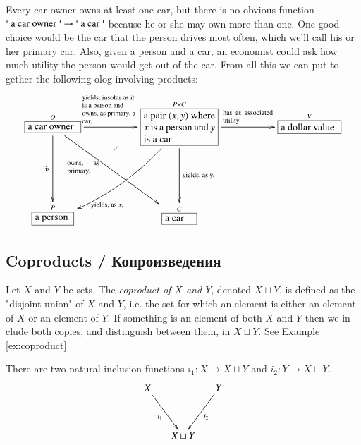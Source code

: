 \documentclass{book}
\def\tn{\textnormal}
\def\to{\rightarrow}
\def\taking{\colon}
\def\rr{\raggedright}
\newcommand{\LA}[2]{\ar[#1]^-{\tn {#2}}}
\newcommand{\LAL}[2]{\ar[#1]_-{\tn {#2}}}
\newcommand{\obox}[3]{\stackrel{#1}{\fbox{\parbox{#2}{#3}}}}
\newcommand{\fakebox}[1]{\tn{$\ulcorner$#1$\urcorner$}}
\theoremstyle{theoremENG}
\theoremstyle{lemmaENG}
\theoremstyle{propositionENG}
\theoremstyle{corollaryENG}
\theoremstyle{factENG}
\theoremstyle{remarkENG}
\theoremstyle{exampleENG}
\newtheorem{exampleENG}[subsubsection]{\begin{english}Example\end{english}}
\theoremstyle{warningENG}
\theoremstyle{questionENG}
\theoremstyle{guessENG}
\theoremstyle{answerENG}
\theoremstyle{constructionENG}
\theoremstyle{rulesENG}
\theoremstyle{excENG}
\theoremstyle{appENG}
\theoremstyle{definitionENG}
\newtheorem{definitionENG}[subsubsection]{\begin{english}Definition\end{english}}
\theoremstyle{notationENG}
\theoremstyle{conjectureENG}
\theoremstyle{postulateENG}
\theoremstyle{theoremRUS}
\theoremstyle{lemmaRUS}
\theoremstyle{propositionRUS}
\theoremstyle{corollaryRUS}
\theoremstyle{factRUS}
\theoremstyle{remarkRUS}
\theoremstyle{exampleRUS}
\theoremstyle{warningRUS}
\theoremstyle{questionRUS}
\theoremstyle{guessRUS}
\theoremstyle{answerRUS}
\theoremstyle{constructionRUS}
\theoremstyle{rulesRUS}
\theoremstyle{excRUS}
\theoremstyle{appRUS}
\theoremstyle{definitionRUS}
\theoremstyle{notationRUS}
\theoremstyle{conjectureRUS}
\theoremstyle{postulateRUS}
\begin{document}
\begin{english}
\begin{exampleENG}
Every car owner owns at least one car, but there is no obvious function $\fakebox{a car owner}\to\fakebox{a car}$ because he or she may own more than one. One good choice would be the car that the person drives most often, which we'll call his or her primary car. Also, given a person and a car, an economist could ask how much utility the person would get out of the car. From all this we can put together the following olog involving products:
$$
\xymatrixnocompile{\obox{O}{.7in}{a car owner}\LAL{dd}{is}\ar[ddrr]_(.35){\parbox{.45in}{\scriptsize owns, as primary,}}\LA{rr}{\parbox{.8in}{\rr\scriptsize yields, insofar as it is a person and owns, as primary, a car,}}&\ar@{}[d]^(.4){\checkmark}&
\obox{P\times C}{1in}{a pair $(x,y)$ where $x$ is a person and $y$ is a car}\ar@/^1pc/[ddll]^(.7){\tn{yields, as }x,}\LA{dd}{\tn{yields, as }y,}\LA{rr}{\parbox{.7in}{\scriptsize has as associated utility}}&&\obox{V}{.8in}{a dollar value}\\&&\\\obox{P}{.5in}{a person}&&\obox{C}{.4in}{a car}
}
$$

\begin{russian} \end{russian}

\end{exampleENG}


\subsection{Coproducts / Копроизведения}\label{sec:coproducts}

\begin{definitionENG}\label{def:coproduct}

Let $X$ and $Y$ be sets. The {\em coproduct of $X$ and $Y$}, denoted $X\sqcup Y$, is defined as the "disjoint union" of $X$ and $Y$, i.e. the set for which an element is either an element of $X$ or an element of $Y$. If something is an element of both $X$ and $Y$ then we include both copies, and distinguish between them, in $X\sqcup Y$. See Example \ref{ex:coproduct}

\begin{russian} \end{russian}

There are two natural inclusion functions $i_1\taking X\to X\sqcup Y$ and $i_2\taking Y\to X\sqcup Y$.
$$\xymatrix@=15pt{X\ar[ddr]_{i_1}&&Y\ar[ddl]^{i_2}\\\\&X\sqcup Y}$$


\end{definitionENG}
\end{english}
\end{document}
